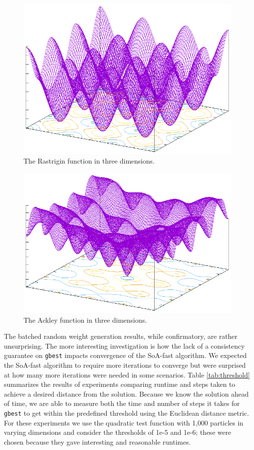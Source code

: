 \begin{figure}
  \includegraphics[width=\columnwidth]{../img/output/rastrigin}
  \caption{The Rastrigin function in three dimensions.}\label{fig:rastrigin}
\end{figure}

\begin{figure}
  \includegraphics[width=\columnwidth]{../img/output/ackley}
  \caption{The Ackley function in three dimensions.}\label{fig:ackley}
\end{figure}

The batched random weight generation results, while confirmatory, are rather
unsurprising. The more interesting investigation is how the lack of a
consistency guarantee on \texttt{gbest} impacts convergence of the SoA-fast algorithm. We
expected the SoA-fast algorithm to require more iterations to converge
but were surprised at how many more iterations were needed in some
scenarios. Table \ref{tab:threshold} summarizes the results of experiments
comparing runtime and steps taken to achieve a desired distance from the
solution. Because we know the solution ahead of time, we are able to measure
both the time and number of steps it
takes for \texttt{gbest} to get within the predefined threshold using the
Euclidean distance metric. For these experiments we use the quadratic test
function with 1,000 particles in varying dimensions and
consider the thresholds of 1e-5 and 1e-6; these were chosen because they
gave interesting and reasonable runtimes.

